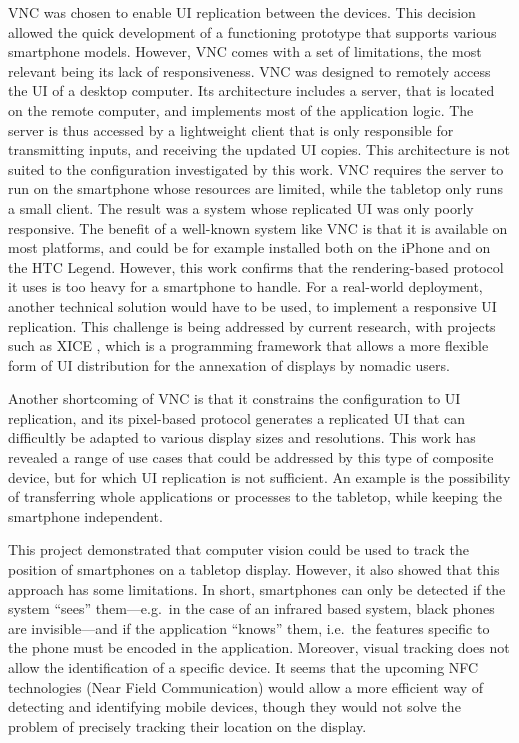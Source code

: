VNC \citep{Richardson:1998:vnc} was chosen to enable UI replication between the devices.
This decision allowed the quick development of a functioning prototype that supports various smartphone models.
However, VNC comes with a set of limitations, the most relevant being its lack of responsiveness.
VNC was designed to remotely access the UI of a desktop computer.
Its architecture includes a server, that is located on the remote computer, and implements most of the application logic.
The server is thus accessed by a lightweight client that is only responsible for transmitting inputs, and receiving the updated UI copies.
This architecture is not suited to the configuration investigated by this work.
VNC requires the server to run on the smartphone whose resources are limited, while the tabletop only runs a small client.
The result was a system whose replicated UI was only poorly responsive.
The benefit of a well-known system like VNC is that it is available on most platforms, and could be for example installed both on the iPhone and on the HTC Legend.
However, this work confirms that the rendering-based protocol it uses is too heavy for a smartphone to handle.
For a real-world deployment, another technical solution would have to be used, to implement a responsive UI replication.
This challenge is being addressed by current research, with projects such as XICE \citep{Arthur:2011:xice}, which is a programming framework that allows a more flexible form of UI distribution for the annexation of displays by nomadic users.

Another shortcoming of VNC is that it constrains the configuration to UI replication, and its pixel-based protocol generates a replicated UI that can difficultly be adapted to various display sizes and resolutions.
This work has revealed a range of use cases that could be addressed by this type of composite device, but for which UI replication is not sufficient.
An example is the possibility of transferring whole applications or processes to the tabletop, while keeping the smartphone independent.

This project demonstrated that computer vision could be used to track the position of smartphones on a tabletop display.
However, it also showed that this approach has some limitations.
In short, smartphones can only be detected if the system ``sees'' them---e.g.\ in the case of an infrared based system, black phones are invisible---and if the application ``knows'' them, i.e.\ the features specific to the phone must be encoded in the application.
Moreover, visual tracking does not allow the identification of a specific device.
It seems that the upcoming NFC technologies (Near Field Communication) would allow a more efficient way of detecting and identifying mobile devices, though they would not solve the problem of precisely tracking their location on the display.


